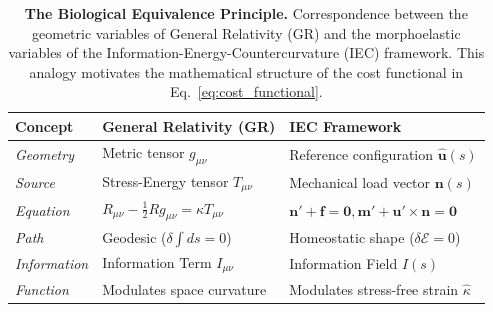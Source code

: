\begin{table}[h!]
  \centering
  \caption{\textbf{The Biological Equivalence Principle.} Correspondence between the geometric variables of General Relativity (GR) and the morphoelastic variables of the Information-Energy-Countercurvature (IEC) framework. This analogy motivates the mathematical structure of the cost functional in Eq.~\ref{eq:cost_functional}.}
  \label{tab:gr_analogy}
  \small
  \begin{tabular}{p{3cm} p{5cm} p{5cm}}
    \toprule
    \textbf{Concept} & \textbf{General Relativity (GR)} & \textbf{IEC Framework} \\
    \midrule
    \textit{Geometry} & Metric tensor $g_{\mu\nu}$ & Reference configuration $\hat{\mathbf{u}}(s)$ \\
    \textit{Source} & Stress-Energy tensor $T_{\mu\nu}$ & Mechanical load vector $\mathbf{n}(s)$ \\
    \textit{Equation} & $R_{\mu\nu} - \frac{1}{2}Rg_{\mu\nu} = \kappa T_{\mu\nu}$ & $\mathbf{n}' + \mathbf{f} = \mathbf{0}, \mathbf{m}' + \mathbf{u}' \times \mathbf{n} = \mathbf{0}$ \\
    \textit{Path} & Geodesic ($\delta \int ds = 0$) & Homeostatic shape ($\delta \mathcal{E} = 0$) \\
    \textit{Information} & Information Term $I_{\mu\nu}$ & Information Field $I(s)$ \\
    \textit{Function} & Modulates space curvature & Modulates stress-free strain $\hat{\kappa}$ \\
    \bottomrule
  \end{tabular}
\end{table}

